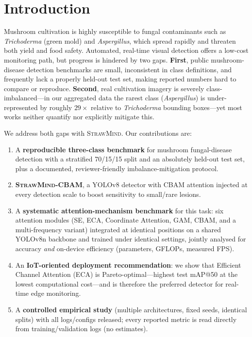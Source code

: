 \documentclass[11pt]{article}
\newcommand{\sm}{\textsc{StrawMind}}
\newcommand{\smc}{\textsc{StrawMind-CBAM}}
\begin{document}
\section{Introduction}
Mushroom cultivation is highly susceptible to fungal contaminants such as \emph{Trichoderma}
(green mold) and \emph{Aspergillus}, which spread rapidly and threaten both yield and food safety.
Automated, real-time visual detection offers a low-cost monitoring path, but progress is hindered
by two gaps. \textbf{First}, public mushroom-disease detection benchmarks are small, inconsistent
in class definitions, and frequently lack a properly held-out test set, making reported numbers
hard to compare or reproduce. \textbf{Second}, real cultivation imagery is severely
class-imbalanced---in our aggregated data the rarest class (\emph{Aspergillus}) is under-represented
by roughly $29\times$ relative to \emph{Trichoderma} bounding boxes---yet most works neither quantify
nor explicitly mitigate this.

We address both gaps with \sm. Our contributions are:
\begin{enumerate}
  \item A \textbf{reproducible three-class benchmark} for mushroom fungal-disease detection with a
  stratified 70/15/15 split and an absolutely held-out test set, plus a documented, reviewer-friendly
  imbalance-mitigation protocol.
  \item \textbf{\smc}, a YOLOv8 detector with CBAM attention injected at every detection scale to
  boost sensitivity to small/rare lesions.
  \item A \textbf{systematic attention-mechanism benchmark} for this task: six attention modules
  (SE, ECA, Coordinate Attention, GAM, CBAM, and a multi-frequency variant) integrated at identical
  positions on a shared YOLOv8n backbone and trained under identical settings, jointly analysed for
  accuracy \emph{and} on-device efficiency (parameters, GFLOPs, measured FPS).
  \item An \textbf{IoT-oriented deployment recommendation}: we show that Efficient Channel Attention
  (ECA) is Pareto-optimal---highest test mAP@50 at the lowest computational cost---and is therefore
  the preferred detector for real-time edge monitoring.
  \item A \textbf{controlled empirical study} (multiple architectures, fixed seeds, identical splits)
  with all logs/configs released; every reported metric is read directly from training/validation
  logs (no estimates).
\end{enumerate}
\end{document}
